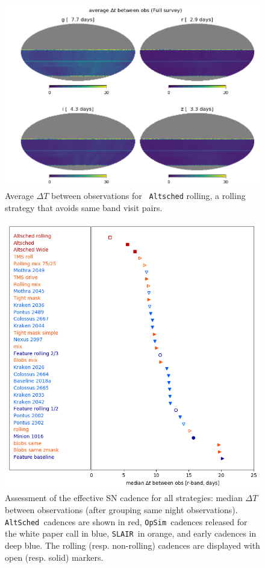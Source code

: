 \documentclass [11pt,a4paper]{article}
\newcommand{\opsim}{{\tt OpSim\ }}
\newcommand{\slair}{{\tt SLAIR\ }}
\newcommand{\altsched}{{\tt AltSched\ }}
\begin{document}
\begin{figure}
  \begin{center}
    \includegraphics[width=0.8\linewidth]{Figures/altsched_rolling_cadence.png}
    \caption{Average $\Delta T$ between observations for {\tt
        Altsched} rolling, a rolling strategy that avoids same band
      visit pairs.}
    \label{fig:altsched_rolling_effective_cadences}
  \end{center}
\end{figure}

\begin{figure}
  \begin{center}
    \includegraphics[width=0.8\linewidth]{Figures/cadence.png}
    \caption{Assessment of the effective SN cadence for all
      strategies: median $\Delta T$ between observations (after
      grouping same night observations). \altsched cadences are shown
      in red, \opsim cadences released for the white paper call in
      blue, \slair in orange, and early cadences in deep blue. The
      rolling (resp. non-rolling) cadences are displayed with open
      (resp. solid) markers. }
    \label{fig:effective_cadence}
  \end{center}
\end{figure}
\end{document}
